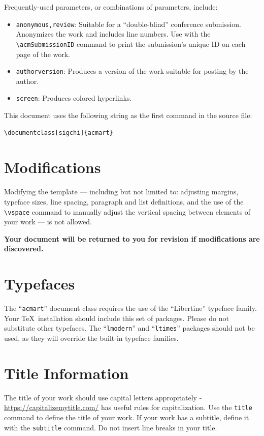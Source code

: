 \documentclass[sigchi]{acmart}
\begin{document}
Frequently-used parameters, or combinations of parameters, include:
\begin{itemize}
\item {\verb|anonymous,review|}: Suitable for a ``double-blind''
  conference submission. Anonymizes the work and includes line
  numbers. Use with the \verb|\acmSubmissionID| command to print the
  submission's unique ID on each page of the work.
\item{\verb|authorversion|}: Produces a version of the work suitable
  for posting by the author.
\item{\verb|screen|}: Produces colored hyperlinks.
\end{itemize}

This document uses the following string as the first command in the
source file:
\begin{verbatim}
\documentclass[sigchi]{acmart}
\end{verbatim}

\section{Modifications}

Modifying the template --- including but not limited to: adjusting
margins, typeface sizes, line spacing, paragraph and list definitions,
and the use of the \verb|\vspace| command to manually adjust the
vertical spacing between elements of your work --- is not allowed.

{\bfseries Your document will be returned to you for revision if
  modifications are discovered.}

\section{Typefaces}

The ``\verb|acmart|'' document class requires the use of the
``Libertine'' typeface family. Your \TeX\ installation should include
this set of packages. Please do not substitute other typefaces. The
``\verb|lmodern|'' and ``\verb|ltimes|'' packages should not be used,
as they will override the built-in typeface families.

\section{Title Information}

The title of your work should use capital letters appropriately -
\url{https://capitalizemytitle.com/} has useful rules for
capitalization. Use the {\verb|title|} command to define the title of
your work. If your work has a subtitle, define it with the
{\verb|subtitle|} command.  Do not insert line breaks in your title.
\end{document}
